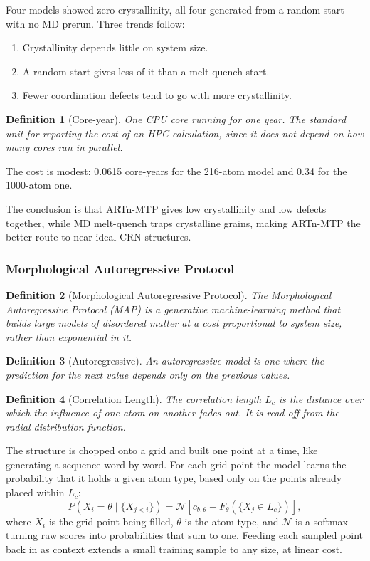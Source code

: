\documentclass{article}
\newtheorem{definition}{Definition}
\begin{document}
Four models showed zero crystallinity, all four generated from a random start with no MD prerun. Three trends follow:
\begin{enumerate}
    \item Crystallinity depends little on system size.
    \item A random start gives less of it than a melt-quench start.
    \item Fewer coordination defects tend to go with more crystallinity.
\end{enumerate}
\begin{definition}[Core-year]
    One CPU core running for one year. The standard unit for reporting the cost of an HPC calculation, since it does not depend on how many cores ran in parallel.
\end{definition}
The cost is modest: 0.0615 core-years for the 216-atom model and 0.34 for the 1000-atom one.

The conclusion is that ARTn-MTP gives low crystallinity and low defects together, while MD melt-quench traps crystalline grains, making ARTn-MTP the better route to near-ideal CRN structures.

\subsubsection{Morphological Autoregressive Protocol}
\begin{definition}[Morphological Autoregressive Protocol]
    The Morphological Autoregressive Protocol (MAP) is a generative machine-learning method that builds large models of disordered matter at a cost proportional to system size, rather than exponential in it.
\end{definition}
\begin{definition}[Autoregressive]
    An autoregressive model is one where the prediction for the next value depends only on the previous values.
\end{definition}
\begin{definition}[Correlation Length]
    The correlation length $L_c$ is the distance over which the influence of one atom on another fades out. It is read off from the radial distribution function.
\end{definition}

The structure is chopped onto a grid and built one point at a time, like generating a sequence word by word. For each grid point the model learns the probability that it holds a given atom type, based only on the points already placed within $L_c$:
\begin{equation}
    P(X_i = \theta \mid \{X_{j<i}\}) = \mathcal{N}\!\left[c_{b,\theta} + F_\theta\!\left(\{X_j \in L_c\}\right)\right],
\end{equation}
where $X_i$ is the grid point being filled, $\theta$ is the atom type, and $\mathcal{N}$ is a softmax turning raw scores into probabilities that sum to one. Feeding each sampled point back in as context extends a small training sample to any size, at linear cost.
\end{document}
